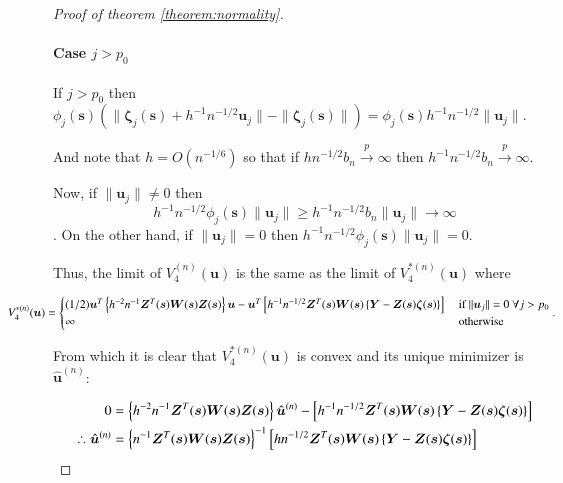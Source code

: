 \documentclass[authoryear, review, 11pt]{elsarticle}
\begin{document}
\begin{proof}[Proof of theorem \ref{theorem:normality}]
            \paragraph{Case $j > p_0$}
            If $j > p_0$ then $\phi_j(\bm{s}) \left( \|\bm{\zeta}_j(\bm{s}) + h^{-1} n^{-1/2} \bm{u}_j \| - \| \bm{\zeta}_j(\bm{s}) \| \right) = \phi_j(\bm{s}) h^{-1} n^{-1/2} \| \bm{u}_j \| $.
        
            And note that $h = O(n^{-1/6})$ so that if $h n^{-1/2} b_n \xrightarrow{p} \infty$ then $h^{-1} n^{-1/2} b_n \xrightarrow{p} \infty$.
        
            Now, if $\| \bm{u}_j \| \ne 0$ then \[h^{-1} n^{-1/2} \phi_j(\bm{s}) \| \bm{u}_j \| \ge h^{-1} n^{-1/2} b_n \| \bm{u}_j \| \to \infty\]. On the other hand, if $\| \bm{u}_j \| = 0$ then $h^{-1} n^{-1/2} \phi_j(\bm{s}) \| \bm{u}_j \| = 0$.

            Thus, the limit of $V_4^{(n)} (\bm{u})$ is the same as the limit of $V_4^{*(n)} (\bm{u})$ where

            \begin{equation*}
                \mkern-72muV_4^{*(n)} (\bm{u}) = \begin{cases}(1/2) \bm{u}^T \left\{ h^{-2} n^{-1} \bm{Z}^T(\bm{s}) \bm{W}(\bm{s}) \bm{Z}(\bm{s}) \right\} \bm{u} - \bm{u}^T \left[ h^{-1} n^{-1/2} \bm{Z}^T(\bm{s}) \bm{W}(\bm{s}) \left\{ \bm{Y} - \bm{Z}(\bm{s}) \bm{\zeta}(\bm{s}) \right\} \right] &\mbox{ if } \| \bm{u}_j \| = 0 \; \forall j > p_0 \\ \infty &\mbox{ otherwise } \end{cases}.
            \end{equation*}


            From which it is clear that  $V_4^{*(n)}(\bm{u})$ is convex and its unique minimizer is $\hat{\bm{u}}^{(n)}$:

            \begin{align} \label{eq:limit}
                0 &=  \left\{ h^{-2} n^{-1} \bm{Z}^T(\bm{s}) \bm{W}(\bm{s}) \bm{Z}(\bm{s}) \right\} \hat{\bm{u}}^{(n)} - \left[ h^{-1} n^{-1/2} \bm{Z}^T(\bm{s}) \bm{W}(\bm{s}) \left\{ \bm{Y} - \bm{Z}(\bm{s}) \bm{\zeta}(\bm{s}) \right\} \right] \notag \\
                \therefore \hat{\bm{u}}^{(n)} &= \left\{ n^{-1} \bm{Z}^T(\bm{s}) \bm{W}(\bm{s}) \bm{Z}(\bm{s}) \right\}^{-1} \left[ h n^{-1/2} \bm{Z}^T(\bm{s}) \bm{W}(\bm{s}) \left\{ \bm{Y} - \bm{Z}(\bm{s}) \bm{\zeta}(\bm{s}) \right\} \right] \notag \\
            \end{align}


\end{proof}
\end{document}
